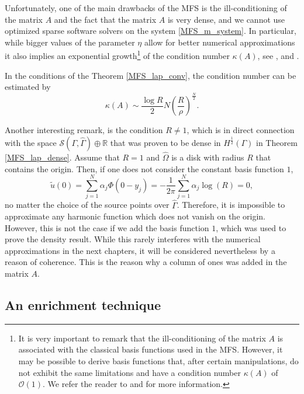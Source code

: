 Unfortunately, one of the main drawbacks of the \ac{MFS} is the ill-conditioning of the matrix \(A\) and the fact that the matrix \(A\) is very dense, and we cannot use optimized sparse software solvers on the system \eqref{MFS_m_system}. In particular, while bigger values of the parameter \(\eta\) allow for better numerical approximations it also implies an exponential growth\footnote{It is very important to remark that the ill-conditioning of the matrix \(A\) is associated with the classical basis functions used in the \ac{MFS}. However, it may be possible to derive basis functions that, after certain manipulations, do not exhibit the same limitations and have a condition number \(\kappa(A)\) of \(\mathcal{O}(1)\). We refer the reader to \cite{antunes2018reducing} and \cite{antunes2018numerical} for more information.} of the condition number \(\kappa(A)\), see \cite{christiansen1981condition}, \cite{kitagawa1988numerical} and \cite{kitagawa1991asymptotic}.
\begin{theorem}
    In the conditions of the Theorem \ref{MFS_lap_conv}, the condition number can be estimated by
    \[
        \kappa(A) \sim \frac{\log R}{2}N \left(\frac{R}{\rho}\right)^{\frac{N}{2}}.
    \]
\end{theorem}
Another interesting remark, is the condition \(R \neq 1\), which is in direct connection with the space \(\mathcal{S}(\Gamma, \hat{\Gamma}) \oplus \mathbb{R}\) that was proven to be dense in \(H^\frac{1}{2}(\Gamma)\) in Theorem \ref{MFS_lap_dense}. Assume that \(R=1\) and \(\hat{\Omega}\) is a disk with radius \(R\) that contains the origin. Then, if one does not consider the constant basis function \(1\),
\[
    \tilde{u}(0) = \sum_{j=1}^{N}\alpha_j \Phi(0-y_j) = -\frac{1}{2\pi}\sum_{j=1}^{N}\alpha_j \log(R) = 0,
\]
no matter the choice of the source points over \(\hat{\Gamma}\). Therefore, it is impossible to approximate any harmonic function which does not vanish on the origin. However, this is not the case if we add the basis function \(1\), which was used to prove the density result. While this rarely interferes with the numerical approximations in the next chapters, it will be considered nevertheless by a reason of coherence. This is the reason why a column of ones was added in the matrix \(A\).

\subsection{An enrichment technique}\label{m_particular_solutions}

